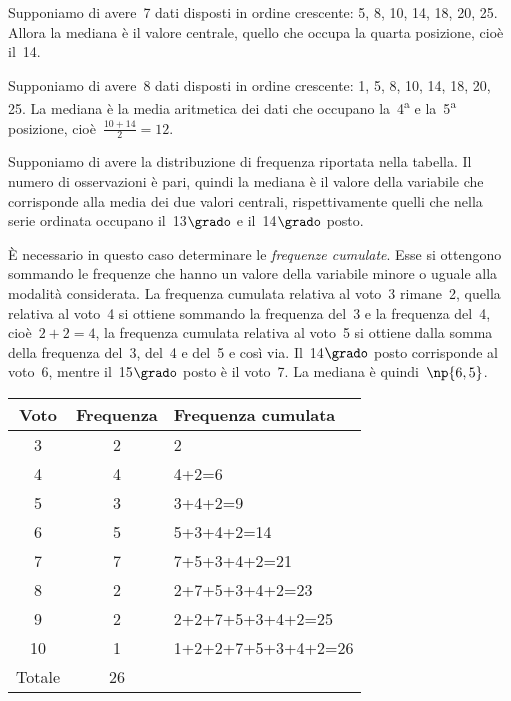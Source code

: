 \begin{exrig}
\begin{esempio}
Supponiamo di avere~7 dati disposti in ordine crescente: 5, 8, 10, 14, 18, 20, 25.
Allora la mediana è il valore centrale, quello che occupa la quarta posizione, cioè il~14.
\end{esempio}

\begin{esempio}
Supponiamo di avere~8 dati disposti in ordine crescente: 1, 5, 8, 10, 14, 18, 20, 25.
La mediana è la media aritmetica dei dati che occupano la~4\textsuperscript{a} e la~5\textsuperscript{a} posizione, cioè~$\frac{10+14}{2}=12$.
\end{esempio}

\begin{esempio}
Supponiamo di avere la distribuzione di frequenza riportata nella tabella.
Il numero di osservazioni è pari, quindi la mediana è il valore della variabile che corrisponde alla media dei due
valori centrali, rispettivamente quelli che nella serie ordinata occupano il~13$\grado$ e il~14$\grado$ posto.

È necessario in questo caso determinare le \emph{frequenze cumulate}. Esse si ottengono sommando le frequenze che hanno un valore della
variabile minore o uguale alla modalità considerata.
La frequenza cumulata relativa al voto~3 rimane~2, quella relativa al voto~4 si ottiene sommando
la frequenza del~3 e la frequenza del~4, cioè~$2+2=4$, la frequenza cumulata relativa al voto~5 si ottiene dalla somma
della frequenza del~3, del~4 e del~5 e così via. Il~14$\grado$ posto corrisponde al voto~6, mentre il~15$\grado$ posto è il voto~7.
La mediana è quindi~$\np{6,5}$.
\begin{center}
\begin{tabular}{ccl}
\toprule
Voto & Frequenza & Frequenza cumulata\\
\midrule
3 & 2 & 2 \\
4 & 4 & 4+2=6 \\
5 & 3 & 3+4+2=9 \\
6 & 5 & 5+3+4+2=14 \\
7 & 7 & 7+5+3+4+2=21 \\
8 & 2 & 2+7+5+3+4+2=23 \\
9 & 2 & 2+2+7+5+3+4+2=25 \\
10 & 1 & 1+2+2+7+5+3+4+2=26 \\
\midrule
Totale & 26 & \\
\bottomrule
\end{tabular}
\end{center}
\end{esempio}
\end{exrig}

